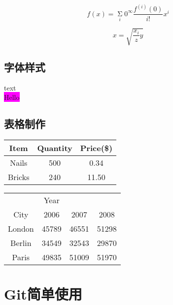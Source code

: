 \documentclass{article}
\begin{document}
        \begin{equation}
        f(x) = \mathop{\Sigma} \limits_{i} 0^{\infty} \frac{f^{(i)}(0)}{i!}x^i
        \end{equation}

        \begin{equation}
        x = \sqrt{\frac{x_i}{z}y}
        \end{equation}

    \subsection {字体样式}
        {\color{cyan}\Large text}\\
        \colorbox{magenta}{\Huge Hello}

    \subsection{表格制作}
        \begin{tabular}{|c|c|c|}
        \hline
        Item   & Quantity & Price(\$) \\
        \hline
        Nails  & 500      & 0.34\\
        Bricks & 240      & 11.50\\
        \hline
        \end{tabular}

        \begin{tabular}{c|ccc}
        & Year & & \\
        \cline{2-4}
        City & 2006 & 2007 & 2008\\
        \hline
        London & 45789 & 46551 & 51298\\
        Berlin & 34549 & 32543 & 29870\\
        Paris  & 49835 & 51009 & 51970\\

        \end{tabular}
    \newpage
    
    \section{Git简单使用}
\end{document}

